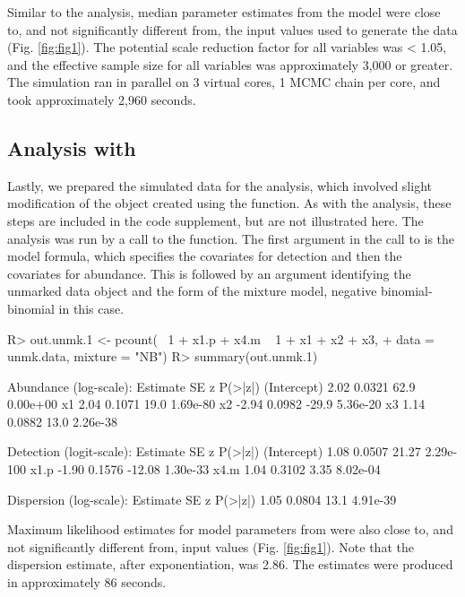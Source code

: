 \documentclass[codesnippet]{jss}
\begin{document}
Similar to the  analysis, median parameter estimates from the 
 model were close to, and not significantly different from, 
the input values used to generate the data (Fig. \ref{fig:fig1}). The 
potential scale reduction factor for all variables was < 1.05, and the 
effective sample size for all variables was approximately 3,000 or greater. 
The simulation ran in parallel on 3 virtual cores, 1 MCMC chain per core, 
and took approximately 2,960 seconds.

\subsection[Analysis with unmarked]{Analysis with }
Lastly, we prepared the simulated data for the  analysis, 
which involved slight modification of the  object created 
using the  function. As with the  analysis, 
these steps are included in the code supplement, but are not illustrated 
here. The  analysis was run by a call to the  
function. The first argument in the call to  is the model 
formula, which specifies the covariates for detection and then the 
covariates for abundance. This is followed by an argument identifying the 
unmarked data object and the form of the mixture model, negative 
binomial-binomial in this case.

\begin{CodeInput}
R> out.unmk.1 <- pcount(~ 1 + x1.p + x4.m ~ 1 + x1 + x2 + x3,
+    data = unmk.data, mixture = "NB")
R> summary(out.unmk.1)
\end{CodeInput}

\begin{CodeOutput}
Abundance (log-scale):
            Estimate       SE       z     P(>|z|)
(Intercept)     2.02   0.0321    62.9    0.00e+00
x1              2.04   0.1071    19.0    1.69e-80
x2             -2.94   0.0982   -29.9    5.36e-20
x3              1.14   0.0882    13.0    2.26e-38

Detection (logit-scale):
            Estimate       SE       z     P(>|z|)
(Intercept)     1.08   0.0507   21.27   2.29e-100
x1.p           -1.90   0.1576  -12.08    1.30e-33
x4.m            1.04   0.3102    3.35    8.02e-04

Dispersion (log-scale):
Estimate          SE     z    P(>|z|)
1.05          0.0804  13.1   4.91e-39
\end{CodeOutput}

Maximum likelihood estimates for model parameters from  were also close to, and not significantly different from, input values (Fig. \ref{fig:fig1}). Note that the dispersion estimate, after exponentiation, was 2.86. The  estimates were produced in approximately 86 seconds.
\end{document}
